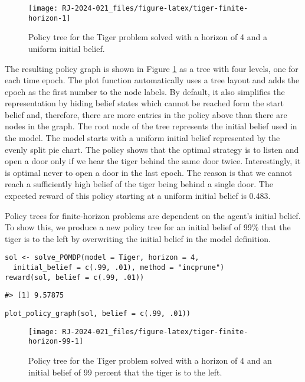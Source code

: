 \begin{figure}
\texttt{[image: RJ-2024-021\_files/figure-latex/tiger-finite-horizon-1]} \caption{Policy tree for the Tiger problem solved with a horizon of 4 and a uniform initial belief.}\label{fig:tiger-finite-horizon}
\end{figure}

The resulting policy graph is shown in Figure \ref{fig:tiger-finite-horizon}
as a tree with four levels, one for each time epoch. The plot function automatically
uses a tree layout and adds the epoch as the first number to the node labels. By default,
it also simplifies the representation by hiding belief states which cannot be reached
form the start belief and, therefore, there are more entries in the policy above
than there are nodes in the graph.
The root node of the tree represents the initial belief
used in the model. The model starts with a uniform initial belief represented by the evenly split pie chart.
The policy shows that
the optimal strategy is
to listen and open a door only if we hear the tiger behind the same door twice.
Interestingly, it is optimal never to open a door in
the last epoch. The reason is that we cannot reach a sufficiently high belief of the tiger being behind a single door.
The expected reward of this policy starting at a uniform initial belief is
0.483.

Policy trees for finite-horizon problems are dependent on the agent's
initial belief. To show this, we produce a new policy tree
for an initial belief of 99\% that the tiger is to the left by overwriting the initial belief in the model definition.

\begin{verbatim}
sol <- solve_POMDP(model = Tiger, horizon = 4, 
  initial_belief = c(.99, .01), method = "incprune")
reward(sol, belief = c(.99, .01))
\end{verbatim}

\begin{verbatim}
#> [1] 9.57875
\end{verbatim}

\begin{verbatim}
plot_policy_graph(sol, belief = c(.99, .01))
\end{verbatim}

\begin{figure}
\texttt{[image: RJ-2024-021\_files/figure-latex/tiger-finite-horizon-99-1]} \caption{Policy tree for the Tiger problem solved with a horizon of 4 and an initial belief of 99 percent that the tiger is to the left.}\label{fig:tiger-finite-horizon-99}
\end{figure}

